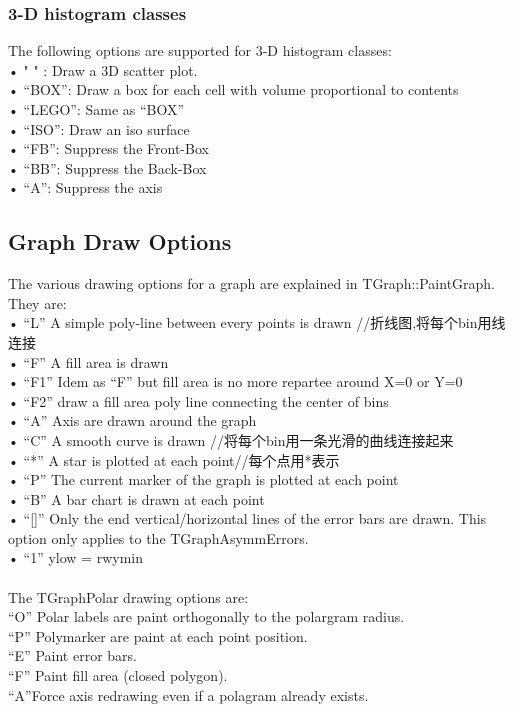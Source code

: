\documentclass[11pt,a4paper,titlepage]{article}
\begin{document}
{\subsubsection{3-D histogram classes}
The following options are supported for 3-D histogram classes:\\
• " " : Draw a 3D scatter plot.\\
• “BOX”: Draw a box for each cell with volume proportional to contents\\
• “LEGO”: Same as “BOX”\\
• “ISO”: Draw an iso surface\\
• “FB”: Suppress the Front-Box\\
• “BB”: Suppress the Back-Box\\
• “A”: Suppress the axis\\

\subsection{Graph Draw Options} %
The various drawing options for a graph are explained in TGraph::PaintGraph. They are:\\
• “L” A simple poly-line between every points is drawn   //折线图,将每个bin用线连接\\
• “F” A fill area is drawn\\
• “F1” Idem as “F” but fill area is no more repartee around X=0 or Y=0\\
• “F2” draw a fill area poly line connecting the center of bins\\
• “A” Axis are drawn around the graph\\
• “C” A smooth curve is drawn  //将每个bin用一条光滑的曲线连接起来\\
• “*” A star is plotted at each point//每个点用*表示\\
• “P” The current marker of the graph is plotted at each point\\
• “B” A bar chart is drawn at each point\\
• “[]” Only the end vertical/horizontal lines of the error bars are drawn. This option only applies to the TGraphAsymmErrors.\\
• “1” ylow = rwymin\\
\\
The TGraphPolar drawing options are:\\
“O” Polar labels are paint orthogonally to the polargram radius.\\
“P” Polymarker are paint at each point position.\\
“E” Paint error bars.\\
“F” Paint fill area (closed polygon).\\
“A”Force axis redrawing even if a polagram already exists.\\

}
\end{document}
